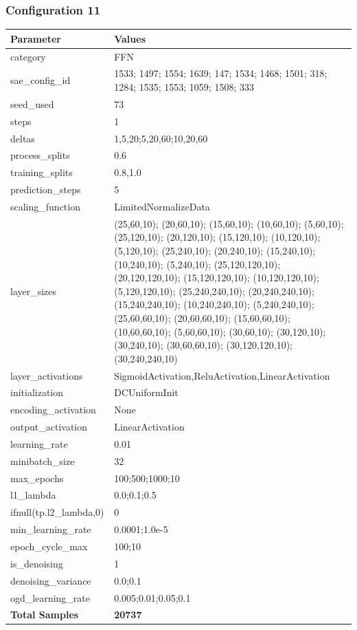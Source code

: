 \documentclass[a4paper,11pt,oneside]{article}
\theoremstyle{plain}
\theoremstyle{definition}
\begin{document}
	\newpage
	\subsubsection{Configuration 11}\label{config11}
	\begin{longtable}[H]{|p{0.3\linewidth}|p{0.7\linewidth}|} \hline \textbf{Parameter} &\textbf{Values} \\\hline{category} & {FFN} \\\hline
		{sae\_config\_id} & {1533; 1497; 1554; 1639; 147; 1534; 1468; 1501; 318; 1284; 1535; 1553; 1059; 1508; 333} \\\hline
		{seed\_used} & {73} \\\hline
		{steps} & {1} \\\hline
		{deltas} & {1,5,20;5,20,60;10,20,60} \\\hline
		{process\_splits} & {0.6} \\\hline
		{training\_splits} & {0.8,1.0} \\\hline
		{prediction\_steps} & {5} \\\hline
		{scaling\_function} & {LimitedNormalizeData} \\\hline
		{layer\_sizes} & {(25,60,10); (20,60,10); (15,60,10); (10,60,10); (5,60,10); (25,120,10); (20,120,10); (15,120,10); (10,120,10); (5,120,10); (25,240,10); (20,240,10); (15,240,10); (10,240,10); (5,240,10); (25,120,120,10); (20,120,120,10); (15,120,120,10); (10,120,120,10); (5,120,120,10); (25,240,240,10); (20,240,240,10); (15,240,240,10); (10,240,240,10); (5,240,240,10); (25,60,60,10); (20,60,60,10); (15,60,60,10); (10,60,60,10); (5,60,60,10); (30,60,10); (30,120,10); (30,240,10); (30,60,60,10); (30,120,120,10); (30,240,240,10)} \\\hline
		{layer\_activations} & {SigmoidActivation,ReluActivation,LinearActivation} \\\hline
		{initialization} & {DCUniformInit} \\\hline
		{encoding\_activation} & {None} \\\hline
		{output\_activation} & {LinearActivation} \\\hline
		{learning\_rate} & {0.01} \\\hline
		{minibatch\_size} & {32} \\\hline
		{max\_epochs} & {100;500;1000;10} \\\hline
		{l1\_lambda} & {0.0;0.1;0.5} \\\hline
		{ifnull(tp.l2\_lambda,0)} & {0} \\\hline
		{min\_learning\_rate} & {0.0001;1.0e-5} \\\hline
		{epoch\_cycle\_max} & {100;10} \\\hline
		{is\_denoising} & {1} \\\hline
		{denoising\_variance} & {0.0;0.1} \\\hline
		{ogd\_learning\_rate} & {0.005;0.01;0.05;0.1} \\\hline
		{\textbf{Total Samples}} & {\textbf{20737}} \\\hline
	\end{longtable}
	
\end{document}
